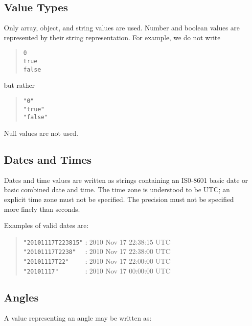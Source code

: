 \subsection{Value Types}

Only array, object, and string values are used. Number and boolean values are represented by their string representation. For example, we do not write
\begin{quote}
\verb|0|\\
\verb|true|\\
\verb|false|\\
\end{quote}
but rather 
\begin{quote}
\verb|"0"|\\
\verb|"true"|\\
\verb|"false"|\\
\end{quote}
Null values are not used.

\subsection{Dates and Times}

Dates and time values are written as strings containing an IS0-8601 basic date or basic combined date and time.
The time zone is understood to be UTC; an explicit time zone must not be specified. The precision must not be specified more finely than seconds.

Examples of valid dates are:
\begin{quote}
\verb|"20101117T223815"| : 2010 Nov 17 22:38:15 UTC\\
\verb|"20101117T2238"  | : 2010 Nov 17 22:38:00 UTC\\
\verb|"20101117T22"    | : 2010 Nov 17 22:00:00 UTC\\
\verb|"20101117"       | : 2010 Nov 17 00:00:00 UTC
\end{quote}

\subsection{Angles}

A value representing an angle may be written as:

